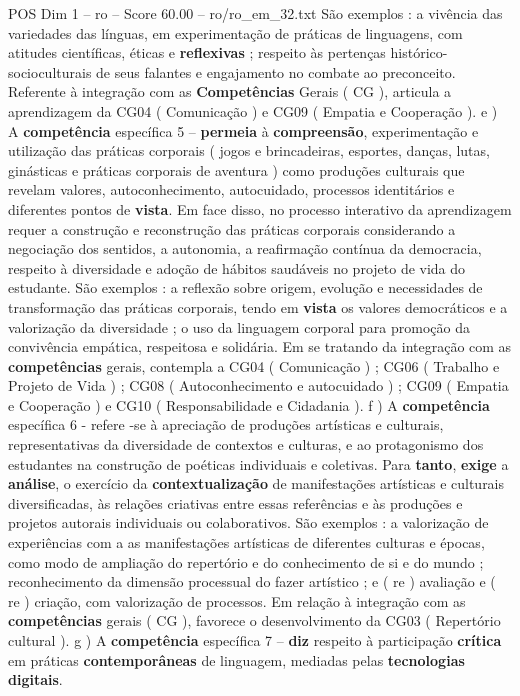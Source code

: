 \begin{textsample}{POS Dim 1 – ro – Score 60.00 – ro/ro\_em\_32.txt}
São exemplos : a vivência das variedades das línguas, em experimentação de práticas de linguagens, com atitudes científicas, éticas e \textbf{reflexivas} ; respeito às pertenças histórico-socioculturais de seus falantes e engajamento no combate ao preconceito.
Referente à integração com as \textbf{Competências} Gerais ( CG ), articula a aprendizagem da CG04 ( Comunicação ) e CG09 ( Empatia e Cooperação ). e ) A \textbf{competência} específica 5 – \textbf{permeia} à \textbf{compreensão}, experimentação e utilização das práticas corporais ( jogos e brincadeiras, esportes, danças, lutas, ginásticas e práticas corporais de aventura ) como produções culturais que revelam valores, autoconhecimento, autocuidado, processos identitários e diferentes pontos de \textbf{vista}.
Em face disso, no processo interativo da aprendizagem requer a construção e reconstrução das práticas corporais considerando a negociação dos sentidos, a autonomia, a reafirmação contínua da democracia, respeito à diversidade e adoção de hábitos saudáveis no projeto de vida do estudante.
São exemplos : a reflexão sobre origem, evolução e necessidades de transformação das práticas corporais, tendo em \textbf{vista} os valores democráticos e a valorização da diversidade ; o uso da linguagem corporal para promoção da convivência empática, respeitosa e solidária.
Em se tratando da integração com as \textbf{competências} gerais, contempla a CG04 ( Comunicação ) ; CG06 ( Trabalho e Projeto de Vida ) ; CG08 ( Autoconhecimento e autocuidado ) ; CG09 ( Empatia e Cooperação ) e CG10 ( Responsabilidade e Cidadania ). f ) A \textbf{competência} específica 6 - refere -se à apreciação de produções artísticas e culturais, representativas da diversidade de contextos e culturas, e ao protagonismo dos estudantes na construção de poéticas individuais e coletivas.
Para \textbf{tanto}, \textbf{exige} a \textbf{análise}, o exercício da \textbf{contextualização} de manifestações artísticas e culturais diversificadas, às relações criativas entre essas referências e às produções e projetos autorais individuais ou colaborativos.
São exemplos : a valorização de experiências com a as manifestações artísticas de diferentes culturas e épocas, como modo de ampliação do repertório e do conhecimento de si e do mundo ; reconhecimento da dimensão processual do fazer artístico ; e ( re ) avaliação e ( re ) criação, com valorização de processos.
Em relação à integração com as \textbf{competências} gerais ( CG ), favorece o desenvolvimento da CG03 ( Repertório cultural ). g ) A \textbf{competência} específica 7 – \textbf{diz} respeito à participação \textbf{crítica} em práticas \textbf{contemporâneas} de linguagem, mediadas pelas \textbf{tecnologias} \textbf{digitais}.

\end{textsample}
